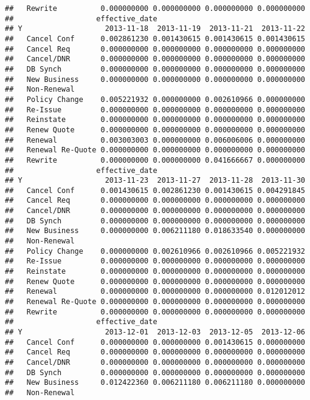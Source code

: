\documentclass[]{article}
\begin{document}
\begin{verbatim}
##   Rewrite          0.000000000 0.000000000 0.000000000 0.000000000
##                   effective_date
## Y                   2013-11-18  2013-11-19  2013-11-21  2013-11-22
##   Cancel Conf      0.002861230 0.001430615 0.001430615 0.001430615
##   Cancel Req       0.000000000 0.000000000 0.000000000 0.000000000
##   Cancel/DNR       0.000000000 0.000000000 0.000000000 0.000000000
##   DB Synch         0.000000000 0.000000000 0.000000000 0.000000000
##   New Business     0.000000000 0.000000000 0.000000000 0.000000000
##   Non-Renewal                                                     
##   Policy Change    0.005221932 0.000000000 0.002610966 0.000000000
##   Re-Issue         0.000000000 0.000000000 0.000000000 0.000000000
##   Reinstate        0.000000000 0.000000000 0.000000000 0.000000000
##   Renew Quote      0.000000000 0.000000000 0.000000000 0.000000000
##   Renewal          0.003003003 0.000000000 0.006006006 0.000000000
##   Renewal Re-Quote 0.000000000 0.000000000 0.000000000 0.000000000
##   Rewrite          0.000000000 0.000000000 0.041666667 0.000000000
##                   effective_date
## Y                   2013-11-23  2013-11-27  2013-11-28  2013-11-30
##   Cancel Conf      0.001430615 0.002861230 0.001430615 0.004291845
##   Cancel Req       0.000000000 0.000000000 0.000000000 0.000000000
##   Cancel/DNR       0.000000000 0.000000000 0.000000000 0.000000000
##   DB Synch         0.000000000 0.000000000 0.000000000 0.000000000
##   New Business     0.000000000 0.006211180 0.018633540 0.000000000
##   Non-Renewal                                                     
##   Policy Change    0.000000000 0.002610966 0.002610966 0.005221932
##   Re-Issue         0.000000000 0.000000000 0.000000000 0.000000000
##   Reinstate        0.000000000 0.000000000 0.000000000 0.000000000
##   Renew Quote      0.000000000 0.000000000 0.000000000 0.000000000
##   Renewal          0.000000000 0.000000000 0.000000000 0.012012012
##   Renewal Re-Quote 0.000000000 0.000000000 0.000000000 0.000000000
##   Rewrite          0.000000000 0.000000000 0.000000000 0.000000000
##                   effective_date
## Y                   2013-12-01  2013-12-03  2013-12-05  2013-12-06
##   Cancel Conf      0.000000000 0.000000000 0.001430615 0.000000000
##   Cancel Req       0.000000000 0.000000000 0.000000000 0.000000000
##   Cancel/DNR       0.000000000 0.000000000 0.000000000 0.000000000
##   DB Synch         0.000000000 0.000000000 0.000000000 0.000000000
##   New Business     0.012422360 0.006211180 0.006211180 0.000000000
##   Non-Renewal                                                     

\end{verbatim}
\end{document}
